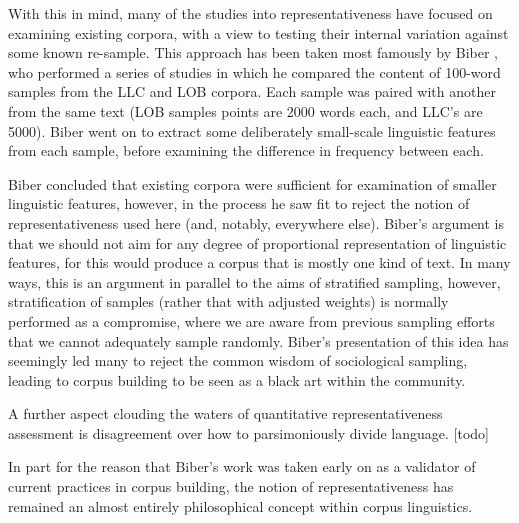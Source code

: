 With this in mind, many of the studies into representativeness have focused on examining existing corpora, with a view to testing their internal variation against some known re-sample.  This approach has been taken most famously by Biber %
, who performed a series of studies in which he compared the content of 100-word samples from the LLC and LOB corpora.  Each sample was paired with another from the same text (LOB samples points are 2000 words each, and LLC's are 5000).  Biber went on to extract some deliberately small-scale linguistic features from each sample, before examining the difference in frequency between each.

Biber concluded that existing corpora were sufficient for examination of smaller linguistic features, however, in the process he saw fit to reject the notion of representativeness used here (and, notably, everywhere else).  Biber's argument is that we should not aim for any degree of proportional representation of linguistic features, for this would produce a corpus that is mostly one kind of text.  In many ways, this is an argument in parallel to the aims of stratified sampling, however, stratification of samples (rather that with adjusted weights) is normally performed as a compromise, where we are aware from previous sampling efforts that we cannot adequately sample randomly.  Biber's presentation of this idea has seemingly led many to reject the common wisdom of sociological sampling, leading to corpus building to be seen as a black art within the community.

A further aspect clouding the waters of quantitative representativeness assessment is disagreement over how to parsimoniously divide language. [todo]

In part for the reason that Biber's work was taken early on as a validator of current practices in corpus building, the notion of representativeness has remained an almost entirely philosophical concept within corpus linguistics. 




% 
% 
% 

